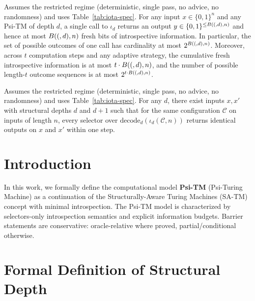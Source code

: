 
\begin{lemma}
  \label{lem:one-step-budget}
  Assumes the restricted regime (deterministic, single pass, no advice, no randomness) and uses Table~\ref{tab:iota-spec}.
For any input $x\in\{0,1\}^n$ and any Psi-TM of depth $d$, a single call to $\iota_d$ returns an output $y\in\{0,1\}^{\le B((,d),n)}$ and hence at most $B((,d),n)$ fresh bits of introspective information. In particular, the set of possible outcomes of one call has cardinality at most $2^{B((,d),n)}$. Moreover, across $t$ computation steps and any adaptive strategy, the cumulative fresh introspective information is at most $t \cdot B((,d),n)$, and the number of possible length-$t$ outcome sequences is at most $2^{t \cdot B((,d),n)}$.
  \end{lemma}
  
  \begin{lemma}
  \label{lem:selector-indistinguishability}
  Assumes the restricted regime (deterministic, single pass, no advice, no randomness) and uses Table~\ref{tab:iota-spec}.
  For any $d$, there exist inputs $x,x'$ with structural depths $d$ and $d+1$ such that for the same configuration $\mathcal{C}$ on inputs of length $n$, every selector over $\mathrm{decode}_d(\iota_d(\mathcal{C},n))$ returns identical outputs on $x$ and $x'$ within one step.
  \end{lemma}
  
  \section{Introduction}\label{sec:introduction}
  
  In this work, we formally define the computational model \textbf{Psi-TM} (Psi-Turing Machine) as a continuation of the Structurally-Aware Turing Machines (SA-TM) concept with minimal introspection. The Psi-TM model is characterized by selectors-only introspection semantics and explicit information budgets. Barrier statements are conservative: oracle-relative where proved, partial/conditional otherwise.
  
  \section{Formal Definition of Structural Depth}
  
